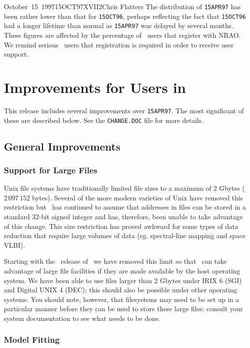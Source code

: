 \documentclass[twoside]{article}
\begin{document}
\begin{aipsletter}{October~15~1997}{15OCT97}{XVII}{2}{Chris Flatters}
The distribution of \texttt{15APR97} has been rather lower than that for
\texttt{15OCT96}, perhaps reflecting the fact that \texttt{15OCT96}
had a longer lifetime than normal as \texttt{15APR97} was delayed by
several months.  These figures are affected by the percentage of
\AIPS\ users that register with NRAO.  We remind serious \AIPS\ users
that registration is required in order to receive user support.

\section{Improvements for Users in \thisrelease}

This release includes several improvements over \texttt{15APR97}.  The
most significant of these are described below.  See the
\texttt{CHANGE.DOC} file for more details.

\subsection{General Improvements}

\subsubsection{Support for Large Files}

Unix file systems have traditionally limited file sizes to a maximum
of 2 Gbytes ($2\,097\,152$ bytes).  Several of the more modern
varieties of Unix have removed this restriction but \AIPS\ has
continued to assume that addresses in files can be stored in a
standard 32-bit signed integer and has, therefore, been unable to take
advantage of this change.  This size restriction has proved awkward
for some types of data reduction that require large volumes of data
(eg. spectral-line mapping and space VLBI).

Starting with the \thisrelease\ release of \AIPS\ we have removed this
limit so that \AIPS\ can take advantage of large file facilities if
they are made available by the host operating system.  We have been
able to use files larger than 2 Gbytes under IRIX 6 (SGI) and Digital
UNIX 4 (DEC); this should also be possible under other operating
systems.  You should note, however, that filesystems may need to be
set up in a particular manner before they can be used to store these
large files: consult your system documentation to see what needs to be
done.

\subsubsection{Model Fitting}


\end{aipsletter}
\end{document}
